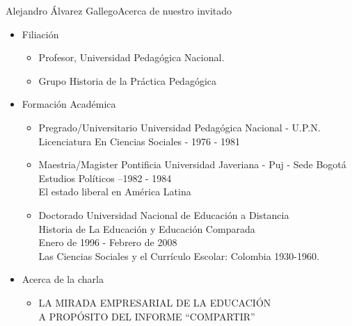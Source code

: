 \documentclass{beamer}
\begin{document}
\begin{frame}{Alejandro Álvarez Gallego}{Acerca de nuestro invitado}

  \begin{itemize}
  \item
    Filiación

    \begin{itemize}
    \item
      Profesor, Universidad Pedagógica Nacional.
    \item
      Grupo Historia de la Práctica Pedagógica
    \end{itemize}
  \item
    Formación Académica

    \begin{itemize}
    \item
      Pregrado/Universitario Universidad Pedagógica Nacional - U.P.N.\\
Licenciatura En Ciencias Sociales - 1976 - 1981
    \item
	Maestria/Magister Pontificia Universidad Javeriana - Puj - Sede Bogotá\\
Estudios Políticos --1982 - 1984\\
El estado liberal en América Latina
    \item
      Doctorado Universidad Nacional de Educación a Distancia\\
Historia de La Educación y Educación Comparada\\
Enero de 1996 - Febrero de 2008\\
Las Ciencias Sociales y el Currículo Escolar: Colombia 1930-1960.\\
    \end{itemize}
  \item
    Acerca de la charla

    \begin{itemize}
    \item
      LA MIRADA EMPRESARIAL DE LA EDUCACIÓN\\
A PROPÓSITO DEL INFORME “COMPARTIR”
    \end{itemize}
  \end{itemize}  
\end{frame}
\end{document}
